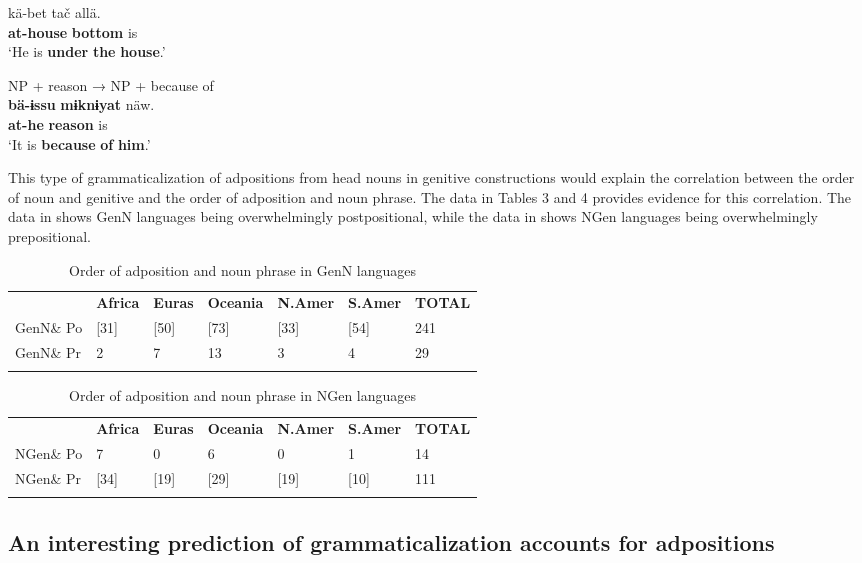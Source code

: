 \documentclass[output=paper]{langsci/langscibook}
\begin{document}
\gll   kä-bet    tač    allä.\\
       \textbf{at-house}  \textbf{bottom}  is\\
\glt   ‘He is \textbf{under} \textbf{the} \textbf{house}.’

\ex  NP + reason → NP + because of\\

\gll   \textbf{bä-ɨssu}  \textbf{mɨknɨyat}  näw.\\
       \textbf{at-he}    \textbf{reason}  is\\
\glt   ‘It is \textbf{because} \textbf{of} \textbf{him}.’
\z
\z

This type of grammaticalization of adpositions from head nouns in genitive constructions would explain the correlation between the order of noun and genitive and the order of adposition and noun phrase. The data in Tables 3 and 4 provides evidence for this correlation. The data in  shows GenN languages being overwhelmingly postpositional, while the data in  shows NGen languages being overwhelmingly prepositional.

\begin{table}
\begin{tabularx}{\textwidth}{XXXXXXX} & \bfseries Africa & \bfseries Euras & \bfseries Oceania & \bfseries N.Amer & \bfseries S.Amer & \bfseries TOTAL\\
\lsptoprule
GenN\& Po & [31] & [50] & [73] & [33] & [54] & 241\\
GenN\& Pr & 2 & 7 & 13 & 3 & 4 & 29\\
\lspbottomrule
\end{tabularx}
\caption{\label{tab:dryer:3}Order of adposition and noun phrase in GenN languages}
\end{table}


\begin{table}
\begin{tabularx}{\textwidth}{XXXXXXX} & \bfseries Africa & \bfseries Euras & \bfseries Oceania & \bfseries N.Amer & \bfseries S.Amer & \bfseries TOTAL\\
\lsptoprule
NGen\& Po & 7 & 0 & 6 & 0 & 1 & 14\\
NGen\& Pr & [34] & [19] & [29] & [19] & [10] & 111\\
\lspbottomrule
\end{tabularx}
\caption{\label{tab:dryer:4}Order of adposition and noun phrase in NGen languages}
\end{table}


\subsection{An interesting prediction of grammaticalization accounts for adpositions}
\end{document}
